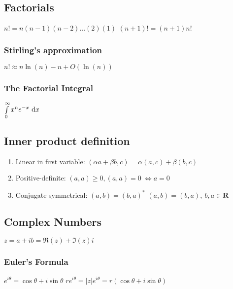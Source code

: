 \subsection{Factorials}
\begin{itemize}
\itemt \( n! = n(n-1)(n-2)...(2)(1) \)
\itemt \( (n+1)! = (n+1)n! \)
\end{itemize}

\subsubsection{Stirling's approximation}
\begin{itemize}
\itemt \( n! \approx n \ln (n) - n + O(\ln(n))\)
\end{itemize}

\subsubsection{The Factorial Integral}
\begin{itemize}
\itemt \( \int\limits_0^\infty x^ne^{-x} \ \mathrm{d}x \)
\end{itemize}           

\subsection{Inner product definition}     
\begin{enumerate}
\item Linear in first variable:
\subitem \( (\alpha a+\beta b, c) = \alpha(a,c) + \beta(b,c)\)
\item Positive-definite:
\subitem \( (a,a) \geq 0, (a,a) = 0\ \iff a = 0 \)
\item Conjugate symmetrical:
\subitem \( (a,b)=(b,a)^* \)
\subitem \( (a,b)=(b,a),\ b,a \in \mathbf{R} \)					
\end{enumerate}	

\subsection{Complex Numbers}
\begin{itemize}
\itemt \( z = a + ib = \Re(z) + \Im(z)i \)
\end{itemize}

\subsubsection{Euler's Formula}				
\begin{itemize}
\itemt \( e^{i\theta} = \cos{\theta} + i\sin{\theta} \)
\itemt \( re^{i\theta} = |z|e^{i\theta} = r(\cos{\theta} + i\sin{\theta}) \)
\end{itemize}

